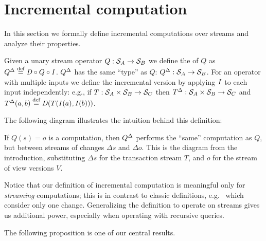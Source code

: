 \section{Incremental computation}\label{sec:incremental}

In this section we formally define incremental computations over
streams and analyze their properties.

\begin{definition}
Given a unary stream operator $Q: \mathcal{S}_{A} \to \mathcal{S}_{B}$ we define the
 of $Q$ as ${Q}^{\Delta} \stackrel{\textrm{\scriptsize def}}{=} \mathit{D} \circ Q \circ \mathit{I}$.
${Q}^{\Delta}$ has the same ``type'' as $Q$: ${Q}^{\Delta}: \mathcal{S}_{A} \to \mathcal{S}_{B}$.
For an operator with multiple inputs we define
the incremental version by applying $\mathit{I}$ to each input independently:
e.g., if $T: \mathcal{S}_{A} \times \mathcal{S}_{B} \rightarrow \mathcal{S}_{C}$ then
${T}^{\Delta}: \mathcal{S}_{A} \times \mathcal{S}_{B} \rightarrow \mathcal{S}_{C}$
and ${T}^{\Delta}(a, b) \stackrel{\textrm{\scriptsize def}}{=} \mathit{D} (T(\mathit{I}(a), \mathit{I}(b)))$.
\end{definition}

The following diagram illustrates the intuition behind this definition:

\begin{center}
\end{center}

If $Q(s) = o$ is a computation, then ${Q}^{\Delta}$ performs
the ``same'' computation as $Q$,
but between streams of changes $\Delta s$ and $\Delta o$.
This is the diagram from the
introduction, substituting $\Delta s$ for the transaction stream $T$,
and $o$ for the stream of view versions $V$.

Notice that our definition of incremental computation is meaningful only for \emph{streaming}
computations; this is in contrast to classic definitions, e.g.~\cite{gupta-idb95} which
consider only one change.  Generalizing the definition to operate on streams gives us
additional power, especially when operating with recursive queries.

The following proposition is one of our central results.

